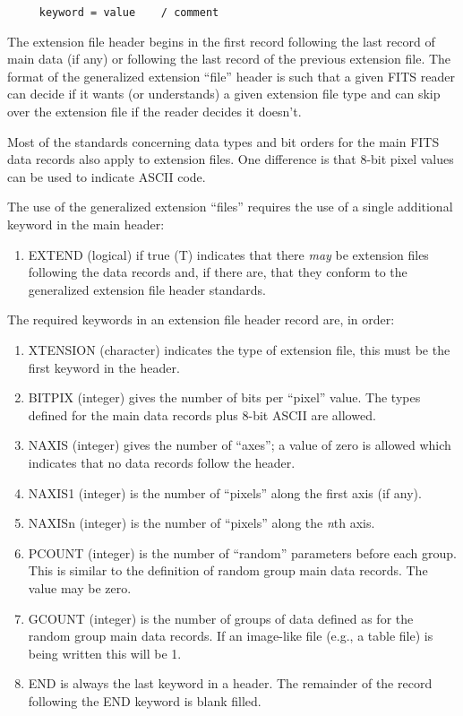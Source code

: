 \begin{verbatim}
     keyword = value    / comment

\end{verbatim}
The extension file header begins in the first record following the
last record of main data (if any) or following the last record of the
previous extension file.  The format of the generalized extension
``file'' header is such that a given FITS reader can decide if it wants
(or understands) a given extension file type and can skip over the
extension file if the reader decides it doesn't.

Most of the standards concerning data types and bit orders for the
main FITS data records also apply to extension files.  One difference
is that 8-bit pixel values can be used to indicate ASCII code.

The use of the generalized extension ``files'' requires the use of a
single additional keyword in the main header:
\begin{enumerate} %
\item EXTEND (logical) if true (T) indicates that there {\it may} be extension
files following the data records and, if there are, that they conform
to the generalized extension file header standards.
\end{enumerate} %
The required keywords in an extension file header record are, in
order:
\begin{enumerate} %
\item XTENSION (character) indicates the type of extension file, this must
be the first keyword in the header.
\item BITPIX (integer) gives the number of bits per ``pixel'' value.  The
types defined for the main data records plus 8-bit ASCII are allowed.
\item NAXIS (integer) gives the number of ``axes''; a value of zero is allowed
which indicates that no data records follow the header.
\item NAXIS1 (integer) is the number of ``pixels'' along the first axis (if
any).
\item NAXISn (integer) is the number of ``pixels'' along the {\it n}th axis.
\item PCOUNT (integer) is the number of ``random'' parameters before each
group.  This is similar to the definition of random group main data
records.  The value may be zero.
\item GCOUNT (integer) is the number of groups of data defined as for the
random group main data records. If an image-like file (e.g., a table
file) is being written this will be 1.
\item END is always the last keyword in a header.  The remainder of the
record following the END keyword is blank filled.
\end{enumerate} %

